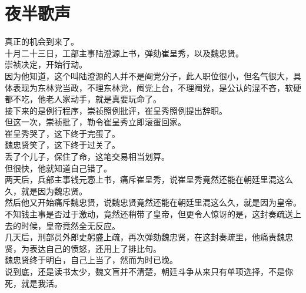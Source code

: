 \section{夜半歌声}
\ifnum{}
	\begin{multicols}{\theparacolNo}
\fi
真正的机会到来了。\\

十月二十三日，工部主事陆澄源上书，弹劾崔呈秀，以及魏忠贤。\\

崇祯决定，开始行动。\\

因为他知道，这个叫陆澄源的人并不是阉党分子，此人职位很小，但名气很大，具体表现为东林党当政，不理东林党，阉党上台，不理阉党，是公认的混不吝，软硬都不吃，他老人家动手，就是真要玩命了。\\

接下来的是例行程序，崇祯照例批评，崔呈秀照例提出辞职。\\

但这一次，崇祯批了，勒令崔呈秀立即滚蛋回家。\\

崔呈秀哭了，这下终于完蛋了。\\

魏忠贤笑了，这下终于过关了。\\

丢了个儿子，保住了命，这笔交易相当划算。\\

但很快，他就知道自己错了。\\

两天后，兵部主事钱元悫上书，痛斥崔呈秀，说崔呈秀竟然还能在朝廷里混这么久，就是因为魏忠贤。\\

然后他又开始痛斥魏忠贤，说魏忠贤竟然还能在朝廷里混这么久，就是因为皇帝。\\

不知钱主事是否过于激动，竟然还稍带了皇帝，但更令人惊讶的是，这封奏疏送上去的时候，皇帝竟然全无反应。\\

几天后，刑部员外郎史躬盛上疏，再次弹劾魏忠贤，在这封奏疏里，他痛责魏忠贤，为表达自己的愤怒，还用上了排比句。\\

魏忠贤终于明白，自己上当了，然而为时已晚。\\

说到底，还是读书太少，魏文盲并不清楚，朝廷斗争从来只有单项选择，不是你死，就是我活。\\


\end{multicols}
